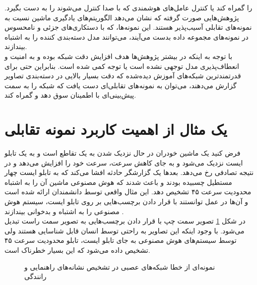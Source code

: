 را گمراه کند یا کنترل عامل‌های هوشمندی که با صدا کنترل ‌می‌شوند
را به دست بگیرد. پژوهش‌هایی صورت گرفته که نشان می‌دهد الگوریتم‌های یادگیری ماشین نسبت به نمونه‌های تقابلی
آسیب‌پذیر هستند. این نمونه‌ها، که با دستکاری‌های
جزئی و نامحسوس در نمونه‌های مجموعه داده بدست می‌آیند، می‌توانند مدل دسته‌بندی کننده
را به اشتباه بیندازند. 
\cite{Akhtar2018ThreatOA}
\\
با توجه به اینکه در بیشتر پژوهش‌ها هدف‌ افزایش دقت شبکه بوده و به امنیت و انعطاف‌پذیری  مدل توجهی نشده است یا توجه کمی شده است. بنابراین حتی برای قدرتمند‌ترین شبکه‌های آموزش دیده‌شده که دقت بسیار بالایی در دسته‌بندی تصاویر گزارش می‌دهند، می‌توان به نمونه‌های تقابلی‌ای دست یافت که شبکه را به سمت پیش‌بینی‌ای با اطمینان سوق دهد و گمراه ‌کند.
\section{یک مثال از اهمیت کاربرد نمونه تقابلی}
فرض کنید یک ماشین خودران در حال نزدیک شدن به یک تقاطع است و به یک تابلو ایست نزدیک می‌شود و به جای کاهش سرعت، سرعت خود را افزایش می‌دهد و در نتیجه تصادفی رخ می‌دهد. بعدها یک گزارشگر حادثه افشا می‌کند که به تابلو ایست چهار مستطیل چسبیده بودند و باعث شدند که هوش مصنوعی ماشین آن را به اشتباه محدودیت سرعت ۴۵ تشخیص دهد. این مثال واقعی توسط دانشمندان ارائه شده است و آن‌ها در عمل توانستند با قرار دادن برچسب‌هایی بر روی تابلو ایست، سیستم هوش مصنوعی را به اشتباه و بدخوانی بیندازند
\cite{Evtimov2017RobustPA}.
\\
در ‏شکل
\ref{stop_speed}
تصویر سمت چپ با قرار دادن برچسب‌هایی به تصویر سمت راست تبدیل می‌شود. با وجود اینکه این تصاویر به راحتی توسط انسان قابل شناسایی هستند ولی توسط سیستم‌های هوش مصنوعی به جای تابلو ایست، تابلو محدودیت سرعت ۴۵ تشخیص داده ‌می‌شود که این بسیار خطرناک است. 
\cite{Heaven2019DLFool}
\begin{figure}[H]
	\caption{نمونه‌ای از خطا شبکه‌های عصبی در تشخیص نشانه‌های راهنمایی و رانندگی
	\cite{Evtimov2017RobustPA}}
	\label{stop_speed}
\end{figure}
